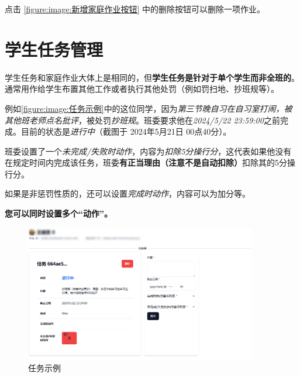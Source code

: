 \documentclass[lang=cn]{elegantpaper}
\begin{document}
    点击 \autoref{figure:image:新增家庭作业按钮} 中的删除按钮可以删除一项作业。

\section{学生任务管理}
    \label{section:学生任务管理}

    学生任务和家庭作业大体上是相同的，但\textbf{学生任务是针对于单个学生而非全班的}。通常用作给学生布置其他工作或者执行其他处罚（例如罚扫地、抄班规等）。

    例如\autoref{figure:image:任务示例}中的这位同学，因为\textit{第三节晚自习在自习室打闹，被其他班老师点名批评}，被处罚\textit{抄班规}。班委要求他在\textit{2024/5/22 23:59:00}之前完成。目前的状态是\textit{进行中}（截图于 2024年5月21日 00点40分）。

    班委设置了一个\textit{未完成/失败时动作}，内容为\textit{扣除5分操行分}，这代表如果他没有在规定时间内完成该任务，班委\textbf{有正当理由（注意不是自动扣除）}扣除其的5分操行分。

    如果是非惩罚性质的，还可以设置\textit{完成时动作}，内容可以为加分等。

    \textbf{您可以同时设置多个“动作”。}

    \begin{figure}[htbp]
        \centering
        \includegraphics[width=0.9\textwidth]{figure/images/task-example.png}
        \caption{任务示例}\label{figure:image:任务示例}
    \end{figure}
\end{document}
